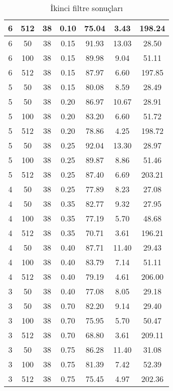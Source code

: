 \begin{table}
{\begin{tabular}{ | c | c | c | c | c | c | c |}
6 & 512 & 38 & 0.10 & 75.04 & 3.43 & 198.24 \\ \hline
6 & 50 & 38 & 0.15 & 91.93 & 13.03 & 28.50 \\ \hline
6 & 100 & 38 & 0.15 & 89.98 & 9.04 & 51.11 \\ \hline
6 & 512 & 38 & 0.15 & 87.97 & 6.60 & 197.85 \\ \hline
5 & 50 & 38 & 0.15 & 80.08 & 8.59 & 28.49 \\ \hline
5 & 50 & 38 & 0.20 & 86.97 & 10.67 & 28.91 \\ \hline
5 & 100 & 38 & 0.20 & 83.20 & 6.60 & 51.72 \\ \hline
5 & 512 & 38 & 0.20 & 78.86 & 4.25 & 198.72 \\ \hline
5 & 50 & 38 & 0.25 & 92.04 & 13.30 & 28.97 \\ \hline
5 & 100 & 38 & 0.25 & 89.87 & 8.86 & 51.46 \\ \hline
5 & 512 & 38 & 0.25 & 87.40 & 6.69 & 203.21 \\ \hline
4 & 50 & 38 & 0.25 & 77.89 & 8.23 & 27.08 \\ \hline
4 & 50 & 38 & 0.35 & 82.77 & 9.32 & 27.95 \\ \hline
4 & 100 & 38 & 0.35 & 77.19 & 5.70 & 48.68 \\ \hline
4 & 512 & 38 & 0.35 & 70.71 & 3.61 & 196.21 \\ \hline
4 & 50 & 38 & 0.40 & 87.71 & 11.40 & 29.43 \\ \hline
4 & 100 & 38 & 0.40 & 83.79 & 7.14 & 51.11 \\ \hline
4 & 512 & 38 & 0.40 & 79.19 & 4.61 & 206.00 \\ \hline
3 & 50 & 38 & 0.40 & 77.08 & 8.05 & 29.18 \\ \hline
3 & 50 & 38 & 0.70 & 82.20 & 9.14 & 29.40 \\ \hline
3 & 100 & 38 & 0.70 & 75.95 & 5.70 & 50.47 \\ \hline
3 & 512 & 38 & 0.70 & 68.80 & 3.61 & 209.11 \\ \hline
3 & 50 & 38 & 0.75 & 86.28 & 11.40 & 31.08 \\ \hline
3 & 100 & 38 & 0.75 & 81.39 & 7.42 & 52.39 \\ \hline
3 & 512 & 38 & 0.75 & 75.45 & 4.97 & 202.36 \\ \hline
\end{tabular}
\caption{İkinci filtre sonuçları}
\label{table:results2}
}
\end{table}
